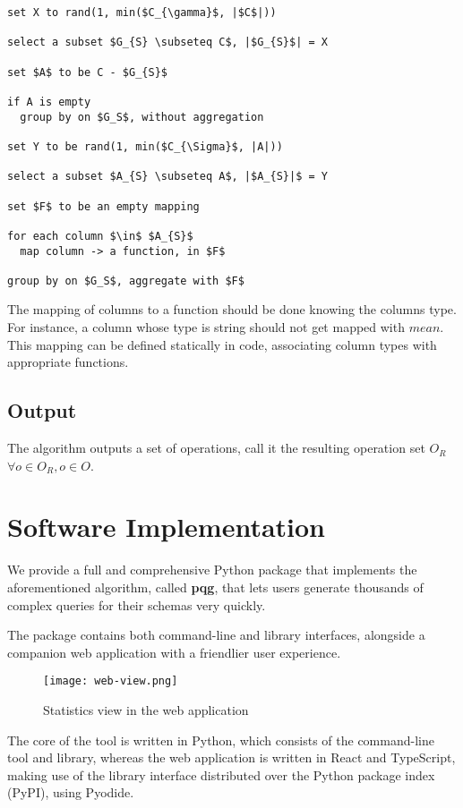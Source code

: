 \documentclass[10pt, twocolumn]{article}
\begin{document}
\spacing
\begin{lstlisting}
set X to rand(1, min($C_{\gamma}$, |$C$|))

select a subset $G_{S} \subseteq C$, |$G_{S}$| = X

set $A$ to be C - $G_{S}$

if A is empty
  group by on $G_S$, without aggregation

set Y to be rand(1, min($C_{\Sigma}$, |A|))

select a subset $A_{S} \subseteq A$, |$A_{S}|$ = Y

set $F$ to be an empty mapping

for each column $\in$ $A_{S}$
  map column -> a function, in $F$

group by on $G_S$, aggregate with $F$
\end{lstlisting}

\spacing
\noindent
The mapping of columns to a function should be done knowing the columns type. For instance, a column whose type is string should not get mapped with $mean$. This mapping can be defined statically in code, associating column types with appropriate functions.

\subsection*{Output}

The algorithm outputs a set of operations, call it the resulting operation set $O_{R}$  $\forall o \in O_{R}, o \in O$.

\section{Software Implementation}

We provide a full and comprehensive Python package that implements the aforementioned algorithm, called \textbf{pqg}, that lets users generate thousands of complex queries for their schemas very quickly.

\spacing
\noindent
The package contains both command-line and library interfaces, alongside a companion web application with a friendlier user experience.

\begin{figure}[htbp]
  \centering
  \texttt{[image: web-view.png]}
  \caption{Statistics view in the web application}
\end{figure}

\spacing
\noindent
The core of the tool is written in Python, which consists of the command-line tool and library, whereas the web application is written in React and TypeScript, making use of the library interface distributed over the Python package index (PyPI), using Pyodide.
\end{document}
